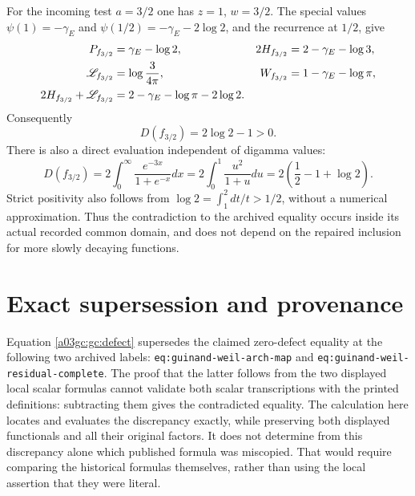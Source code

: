 \documentclass[11pt,a4paper]{article}
\begin{document}
For the incoming test $a=3/2$ one has $z=1$, $w=3/2$.
The special values
$\psi(1)=-\gamma_E$ and $\psi(1/2)=-\gamma_E-2\log2$,
and the recurrence at $1/2$, give
\cite[5.4.12--13 and 5.5.2]{a03gc:dlmf}
\begin{align}
 P_{f_{3/2}}&=\gamma_E-\log2,&
 2H_{f_{3/2}}&=2-\gamma_E-\log3,\notag\\
 \mathscr L_{f_{3/2}}&=\log\frac3{4\pi},&
 W_{f_{3/2}}&=1-\gamma_E-\log\pi,\notag\\
 2H_{f_{3/2}}+\mathscr L_{f_{3/2}}
   &=2-\gamma_E-\log\pi-2\log2.
 \label{a03gc:gc:counterexample-values}
\end{align}
Consequently
\begin{equation}
 \boxed{D(f_{3/2})=2\log2-1>0.}
 \label{a03gc:gc:counterexample}
\end{equation}
There is also a direct evaluation independent of digamma values:
\begin{equation}
 D(f_{3/2})=2\int_0^\infty\frac{e^{-3x}}{1+e^{-x}}dx
 =2\int_0^1\frac{u^2}{1+u}du
 =2\left(\frac12-1+\log2\right).
 \label{a03gc:gc:direct-example}
\end{equation}
Strict positivity also follows from
$\log2=\int_1^2dt/t>1/2$, without a numerical approximation.
Thus the contradiction to the archived equality occurs inside its actual
recorded common domain, and does not depend on the repaired inclusion for
more slowly decaying functions.

\section{Exact supersession and provenance}

Equation \eqref{a03gc:gc:defect} supersedes the claimed zero-defect equality at
the following two archived labels:
\texttt{eq:guinand-weil-arch-map} and
\texttt{eq:guinand-weil-residual-complete}.
The proof that the latter follows from the two displayed local scalar
formulas cannot validate both scalar transcriptions with the printed
definitions: subtracting them gives the contradicted equality.  The
calculation here locates and evaluates the discrepancy exactly, while
preserving both displayed functionals and all their original factors.
It does not determine from this discrepancy alone which published formula
was miscopied.  That would require comparing the historical formulas
themselves, rather than using the local assertion that they were literal.
\end{document}
